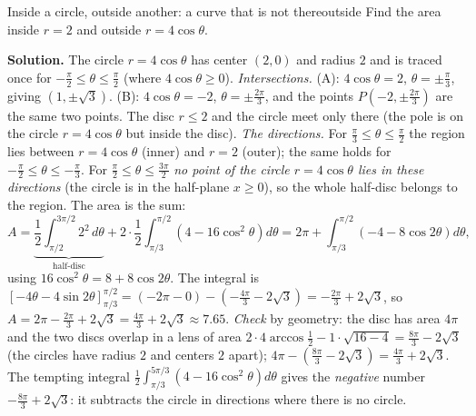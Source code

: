 \documentclass[11pt]{article}
\begin{document}
\begin{exmp}{Inside a circle, outside another: a curve that is not there}{outside}
Find the area inside $r=2$ and outside $r=4\cos\theta$.

\textbf{Solution.} The circle $r=4\cos\theta$ has center $(2,0)$ and radius $2$ and is traced once for $-\frac\pi2\le\theta\le\frac\pi2$ (where $4\cos\theta\ge0$). \emph{Intersections.} (A): $4\cos\theta=2$, $\theta=\pm\frac\pi3$, giving $(1,\pm\sqrt3)$. (B): $4\cos\theta=-2$, $\theta=\pm\frac{2\pi}3$, and the points $P(-2,\pm\frac{2\pi}3)$ are the same two points. The disc $r\le2$ and the circle meet only there (the pole is on the circle $r=4\cos\theta$ but inside the disc). \emph{The directions.} For $\frac\pi3\le\theta\le\frac\pi2$ the region lies between $r=4\cos\theta$ (inner) and $r=2$ (outer); the same holds for $-\frac\pi2\le\theta\le-\frac\pi3$. For $\frac\pi2\le\theta\le\frac{3\pi}2$ \emph{no point of the circle $r=4\cos\theta$ lies in these directions} (the circle is in the half-plane $x\ge0$), so the whole half-disc belongs to the region. The area is the sum:
\[A=\underbrace{\frac12\int_{\pi/2}^{3\pi/2}2^2\,d\theta}_{\text{half-disc}}+2\cdot\frac12\int_{\pi/3}^{\pi/2}\left(4-16\cos^2\theta\right)d\theta=2\pi+\int_{\pi/3}^{\pi/2}\left(-4-8\cos2\theta\right)d\theta,\]
using $16\cos^2\theta=8+8\cos2\theta$. The integral is $\left[-4\theta-4\sin2\theta\right]_{\pi/3}^{\pi/2}=\left(-2\pi-0\right)-\left(-\frac{4\pi}3-2\sqrt3\right)=-\frac{2\pi}3+2\sqrt3$, so $A=2\pi-\frac{2\pi}3+2\sqrt3=\frac{4\pi}3+2\sqrt3\approx7.65$.
\emph{Check} by geometry: the disc has area $4\pi$ and the two discs overlap in a lens of area $2\cdot4\arccos\frac12-1\cdot\sqrt{16-4}=\frac{8\pi}3-2\sqrt3$ (the circles have radius $2$ and centers $2$ apart); $4\pi-\left(\frac{8\pi}3-2\sqrt3\right)=\frac{4\pi}3+2\sqrt3$. The tempting integral $\frac12\int_{\pi/3}^{5\pi/3}\left(4-16\cos^2\theta\right)d\theta$ gives the \emph{negative} number $-\frac{8\pi}3+2\sqrt3$: it subtracts the circle in directions where there is no circle.


\end{exmp}
\end{document}
